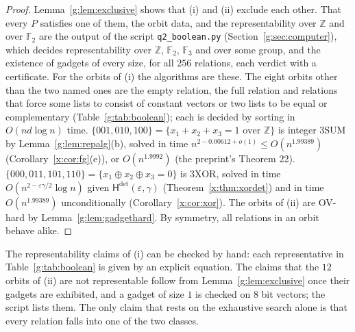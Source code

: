 \documentclass[11pt]{article}
\theoremstyle{definition}
\theoremstyle{remark}
\newcommand{\Z}{\mathbb{Z}}
\newcommand{\F}{\mathbb{F}_2}
\newcommand{\eps}{\varepsilon}
\newcommand{\Hyp}{\mathsf{H}}
\newcommand{\EpsGammaBest}{0.00612}%
\newcommand{\ExpBestUp}{1.99389}%
\begin{document}
\begin{proof}
Lemma~\ref{g:lem:exclusive} shows that (i) and (ii) exclude each other. That every $P$ satisfies one of them, the orbit data, and the representability over $\Z$ and over $\F$ are the output of the script \texttt{q2\_boolean.py} (Section~\ref{g:sec:computer}), which decides representability over $\Z$, $\F$, $\mathbb F_3$ and over some group, and the existence of gadgets of every size, for all $256$ relations, each verdict with a certificate. For the orbits of (i) the algorithms are these. The eight orbits other than the two named ones are the empty relation, the full relation and relations that force some lists to consist of constant vectors or two lists to be equal or complementary (Table~\ref{g:tab:boolean}); each is decided by sorting in $O(nd\log n)$ time. $\{001,010,100\}=\{x_1+x_2+x_3=1\text{ over }\Z\}$ is integer 3SUM by Lemma~\ref{g:lem:repalg}(b), solved in time $n^{2-\EpsGammaBest+o(1)}\le O(n^{\ExpBestUp})$ (Corollary~\ref{x:cor:fg}(e)), or $O(n^{1.9992})$ (the preprint's Theorem 22). $\{000,011,101,110\}=\{x_1\oplus x_2\oplus x_3=0\}$ is 3XOR, solved in time $O(n^{2-\eps\gamma/2}\log n)$ given $\Hyp^{\det}(\eps,\gamma)$ (Theorem~\ref{x:thm:xordet}) and in time $O(n^{\ExpBestUp})$ unconditionally (Corollary~\ref{x:cor:xor}). The orbits of (ii) are OV-hard by Lemma~\ref{g:lem:gadgethard}. By symmetry, all relations in an orbit behave alike.
\end{proof}

The representability claims of (i) can be checked by hand: each representative in Table~\ref{g:tab:boolean} is given by an explicit equation. The claims that the $12$ orbits of (ii) are not representable follow from Lemma~\ref{g:lem:exclusive} once their gadgets are exhibited, and a gadget of size $1$ is checked on $8$ bit vectors; the script lists them. The only claim that rests on the exhaustive search alone is that every relation falls into one of the two classes.
\end{document}
